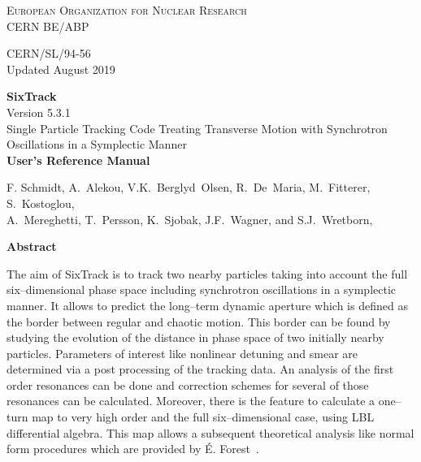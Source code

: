 \begin{titlepage}
\begin{center}\normalsize\scshape
    European Organization for Nuclear Research \\
    CERN BE/ABP
\end{center}
\vspace*{2mm}
\begin{flushright}
    CERN/SL/94-56 \\
    Updated August 2019
\end{flushright}
\begin{center}\Huge
    \textbf{SixTrack} \\
    \LARGE Version 5.3.1 \\
    \vspace*{8mm}Single Particle Tracking Code Treating Transverse Motion with Synchrotron Oscillations in a Symplectic Manner \\
    \vspace*{8mm}\textbf{User's Reference Manual}
\end{center}
\begin{center}
    F. Schmidt,
    A.~Alekou,
    V.K.~Berglyd~Olsen,
    R.~De~Maria,
    M.~Fitterer,
    S.~Kostoglou,\\
    A.~Mereghetti,
    T.~Persson,
    K.~Sjobak,
    J.F.~Wagner,
    and
    S.J.~Wretborn,
\end{center}
\begin{center}\large
    \vspace*{10mm}\textbf{Abstract} \\
\end{center}
The aim of SixTrack is to track two nearby particles taking into account the full six--dimensional phase space including synchrotron oscillations in a symplectic manner.
It allows to predict the long--term dynamic aperture which is defined as the border between regular and chaotic motion.
This border can be found by studying the evolution of the distance in phase space of two initially nearby particles.
Parameters of interest like nonlinear detuning and smear are determined via a post processing of the tracking data.
An analysis of the first order resonances can be done and correction schemes for several of those resonances can be calculated.
Moreover, there is the feature to calculate a one--turn map to very high order and the full six--dimensional case, using LBL differential algebra.
This map allows a subsequent theoretical analysis like normal form procedures which are provided by \'{E}. Forest~\cite{DALIE}.


\end{titlepage}
